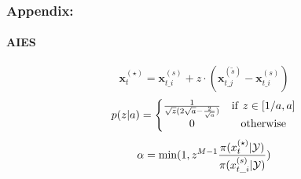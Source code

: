 \begin{frame}
\frametitle{Appendix:}
\framesubtitle{AIES}
\begin{equation*}
\boldsymbol{x}_{t}^{(\star)}
=
\boldsymbol{x}_{t\_i}^{(s)}
+
z \cdot 
(\boldsymbol{x}_{t\_j}^{(\tilde{s})} - \boldsymbol{x}_{t\_i}^{(s)})
\end{equation*}
\begin{equation*}
    p(z|a)= \left\{\begin{matrix}
  \frac{1}{\sqrt{z} (2\sqrt{a} - \frac{2}{\sqrt{a} } )}  & {\rm{if} }\ z \in [1 / a, a]  \\
  0 & {\rm{otherwise} }
\end{matrix}\right.
\end{equation*}
\begin{equation*}
    \alpha = {\rm{min}}
(1,
z^{M-1} 
\frac{\pi({x}_{t}^{(\star)}|\mathcal{Y})}
{\pi({x}_{t\_{i}}^{(s)}|\mathcal{Y})} 
)
\end{equation*}
\end{frame}

